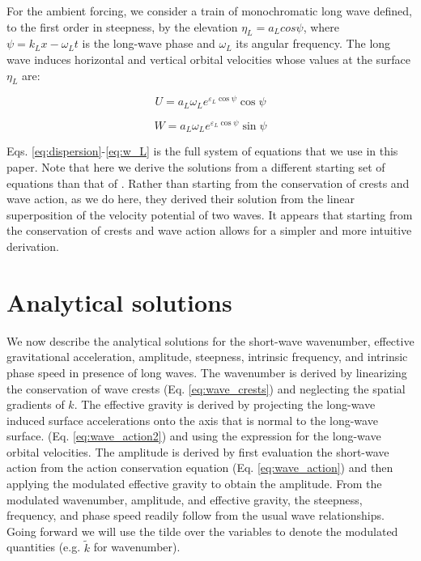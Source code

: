 \documentclass[lineno]{jfm}
\begin{document}
For the ambient forcing, we consider a train of monochromatic long wave
defined, to the first order in steepness, by the elevation $\eta_L = a_L cos{\psi}$,
where $\psi = k_L x - \omega_L t$ is the long-wave phase and $\omega_L$ its
angular frequency.
The long wave induces horizontal and vertical orbital velocities whose values
at the surface $\eta_L$ are:

\begin{equation}
\label{eq:U_L}
U = a_L \omega_L e^{\varepsilon_L \cos{\psi}} \cos{\psi}
\end{equation}

\begin{equation}
\label{eq:w_L}
W = a_L \omega_L e^{\varepsilon_L \cos{\psi}} \sin{\psi}
\end{equation}

Eqs. \ref{eq:dispersion}-\ref{eq:w_L} is the full system of equations that we
use in this paper.
Note that here we derive the solutions from a different starting set of
equations than that of \citet{longuet1960changes}.
Rather than starting from the conservation of crests and wave action, as we do
here, they derived their solution from the linear superposition of the velocity
potential of two waves.
It appears that starting from the conservation of crests and wave action allows
for a simpler and more intuitive derivation.

\section{Analytical solutions}
\label{section:analytical_solutions}

We now describe the analytical solutions for the short-wave wavenumber,
effective gravitational acceleration, amplitude, steepness, intrinsic frequency,
and intrinsic phase speed in presence of long waves.
The wavenumber is derived by linearizing the conservation of wave crests
(Eq. \ref{eq:wave_crests}) and neglecting the spatial gradients of $k$.
The effective gravity is derived by projecting the long-wave induced surface
accelerations onto the axis that is normal to the long-wave surface.
(Eq. \ref{eq:wave_action2}) and using the expression for the long-wave orbital
velocities.
The amplitude is derived by first evaluation the short-wave action from the
action conservation equation (Eq. \ref{eq:wave_action}) and then applying the
modulated effective gravity to obtain the amplitude.
From the modulated wavenumber, amplitude, and effective gravity, the steepness,
frequency, and phase speed readily follow from the usual wave relationships.
Going forward we will use the tilde over the variables to denote the modulated
quantities (e.g. $\widetilde{k}$ for wavenumber).
\end{document}
